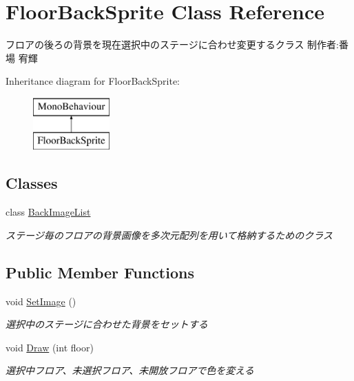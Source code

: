 \hypertarget{class_floor_back_sprite}{}\section{Floor\+Back\+Sprite Class Reference}
\label{class_floor_back_sprite}


フロアの後ろの背景を現在選択中のステージに合わせ変更するクラス 制作者\+:番場 宥輝  


Inheritance diagram for Floor\+Back\+Sprite\+:\begin{figure}[H]
\begin{center}
\leavevmode
\includegraphics[height=2.000000cm]{class_floor_back_sprite}
\end{center}
\end{figure}
\subsection*{Classes}
\begin{DoxyCompactItemize}
\item 
class \hyperlink{class_floor_back_sprite_1_1_back_image_list}{Back\+Image\+List}
\begin{DoxyCompactList}\small\item\em ステージ毎のフロアの背景画像を多次元配列を用いて格納するためのクラス \end{DoxyCompactList}\end{DoxyCompactItemize}
\subsection*{Public Member Functions}
\begin{DoxyCompactItemize}
\item 
void \hyperlink{class_floor_back_sprite_addb7861cc28c88efde4b652023a671ef}{Set\+Image} ()
\begin{DoxyCompactList}\small\item\em 選択中のステージに合わせた背景をセットする \end{DoxyCompactList}\item 
void \hyperlink{class_floor_back_sprite_a29d03cee121d54e7e74c9cd0f82e9ccc}{Draw} (int floor)
\begin{DoxyCompactList}\small\item\em 選択中フロア、未選択フロア、未開放フロアで色を変える \end{DoxyCompactList}\end{DoxyCompactItemize}
